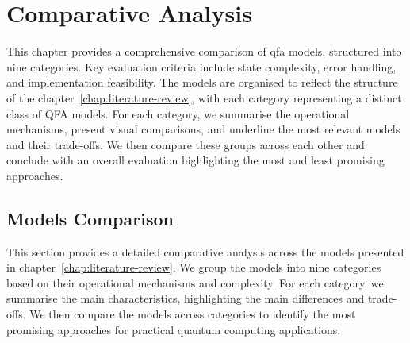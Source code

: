 
\chapter{Comparative Analysis}
\label{chap:comparative-analysis}
This chapter provides a comprehensive comparison of \gls{qfa} models, structured into nine categories. Key evaluation criteria include state complexity, error handling, and implementation feasibility. 
The models are organised to reflect the structure of the chapter~\ref{chap:literature-review}, with each category representing a distinct class of QFA models.
For each category, we summarise the operational mechanisms, present visual comparisons, and underline the most relevant models and their trade-offs. We then compare these groups across each other and conclude with an overall evaluation highlighting the most and least promising approaches.

\section{Models Comparison}
This section provides a detailed comparative analysis across the models presented in chapter~\ref{chap:literature-review}. We group the models into nine categories based on their operational mechanisms and complexity. For each category, we summarise the main characteristics, highlighting the main differences and trade-offs. We then compare the models across categories to identify the most promising approaches for practical quantum computing applications.

\subsection*{}

